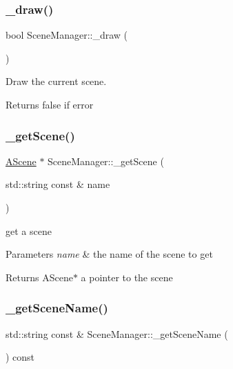 \subsubsection{\texorpdfstring{\+\_\+draw()}{\_draw()}}
{\footnotesize\ttfamily bool Scene\+Manager\+::\+\_\+draw (\begin{DoxyParamCaption}{ }\end{DoxyParamCaption})\hspace{0.3cm}{\ttfamily [protected]}}



Draw the current scene. 

\begin{DoxyReturn}{Returns}
false if error 
\end{DoxyReturn}
\mbox{\label{class_scene_manager_ac0599b120f0aa835792d9679e62f8522}} 
\subsubsection{\texorpdfstring{\+\_\+get\+Scene()}{\_getScene()}}
{\footnotesize\ttfamily \hyperlink{class_a_scene}{A\+Scene} $\ast$ Scene\+Manager\+::\+\_\+get\+Scene (\begin{DoxyParamCaption}\item[{std\+::string const \&}]{name }\end{DoxyParamCaption})\hspace{0.3cm}{\ttfamily [protected]}}



get a scene 


\begin{DoxyParams}{Parameters}
{\em name} & the name of the scene to get \\
\hline
\end{DoxyParams}
\begin{DoxyReturn}{Returns}
A\+Scene$\ast$ a pointer to the scene 
\end{DoxyReturn}
\mbox{\label{class_scene_manager_adfeeb557f7324390b86befdd4bb66daa}} 
\subsubsection{\texorpdfstring{\+\_\+get\+Scene\+Name()}{\_getSceneName()}}
{\footnotesize\ttfamily std\+::string const  \& Scene\+Manager\+::\+\_\+get\+Scene\+Name (\begin{DoxyParamCaption}{ }\end{DoxyParamCaption}) const\hspace{0.3cm}{\ttfamily [protected]}}



